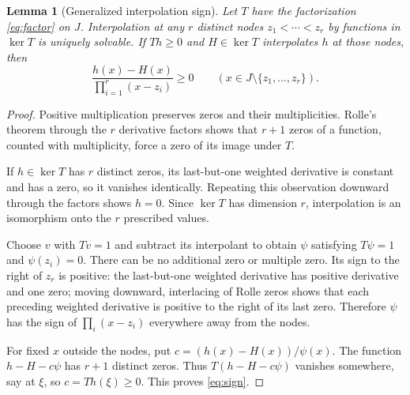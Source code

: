 \documentclass[11pt,reqno]{amsart}
\numberwithin{equation}{section}
\newtheorem{lemma}[theorem]{Lemma}
\theoremstyle{definition}
\theoremstyle{remark}
\begin{document}
\begin{lemma}[Generalized interpolation sign]\label{lem:sign}
Let $T$ have the factorization \eqref{eq:factor} on $J$. Interpolation at any $r$ distinct nodes $z_1<\cdots<z_r$ by functions in $\ker T$ is uniquely solvable. If $Th\ge0$ and $H\in\ker T$ interpolates $h$ at those nodes, then
\begin{equation}\label{eq:sign}
 \frac{h(x)-H(x)}{\prod_{i=1}^r(x-z_i)}\ge0
 \qquad(x\in J\setminus\{z_1,\ldots,z_r\}).
\end{equation}
\end{lemma}
\begin{proof}
Positive multiplication preserves zeros and their multiplicities. Rolle's theorem through the $r$ derivative factors shows that $r+1$ zeros of a function, counted with multiplicity, force a zero of its image under $T$.

If $h\in\ker T$ has $r$ distinct zeros, its last-but-one weighted derivative is constant and has a zero, so it vanishes identically. Repeating this observation downward through the factors shows $h=0$. Since $\ker T$ has dimension $r$, interpolation is an isomorphism onto the $r$ prescribed values.

Choose $v$ with $Tv=1$ and subtract its interpolant to obtain $\psi$ satisfying $T\psi=1$ and $\psi(z_i)=0$. There can be no additional zero or multiple zero. Its sign to the right of $z_r$ is positive: the last-but-one weighted derivative has positive derivative and one zero; moving downward, interlacing of Rolle zeros shows that each preceding weighted derivative is positive to the right of its last zero. Therefore $\psi$ has the sign of $\prod_i(x-z_i)$ everywhere away from the nodes.

For fixed $x$ outside the nodes, put $c=(h(x)-H(x))/\psi(x)$. The function $h-H-c\psi$ has $r+1$ distinct zeros. Thus $T(h-H-c\psi)$ vanishes somewhere, say at $\xi$, so $c=Th(\xi)\ge0$. This proves \eqref{eq:sign}.
\end{proof}
\end{document}
